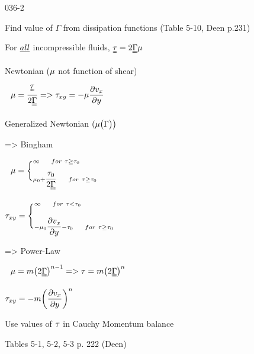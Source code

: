 \begin{mitframe}{036-2}
\begin{listone}
	\item Find value of $\Gamma$ from dissipation functions (Table 5-10, Deen p.231)
    \item For $\uline{all}$ incompressible fluids, $\uuline{\torque}=2\straintens\chempot$
    \item Newtonian ($\chempot$ not function of shear)
    	\begin{listtwo}
    		\item $~~\chempot=\dfrac{\uuline{\torque}}{2\straintens}=>\torque_{\disp{y}}=-\chempot\dfrac{\partial\vvel_{\disp}}{\partial{y}}$
		\end{listtwo}
\item Generalized Newtonian $(\chempot\big(\Gamma\big)\big)$
\item => Bingham
		\begin{listtwo}
        	\item $~~\chempot=\bigg\{^{\infty\tab for~ \torque\geq\torque_0}_{\chempot_0+\dfrac{\torque_0}{2\straintens}\tab for~ \torque\geq\torque_0}$
            \begin{listthree}
            		\item $\torque_{\disp{y}}=\Bigg\{^{\infty\tab for~ \torque<\torque_0}_{-\chempot_0\dfrac{\partial\vvel_{\disp}}{\partial{y}}-\torque_0 \tab for~\torque\geq\torque_0}$
                    
            \end{listthree}
        \end{listtwo}
\item => Power-Law
		\begin{listtwo}
        	\item $~~\chempot=\mass\big(2\straintens\big)^{n-1}=>\torque=\mass\big(2\straintens\big)^n$
            	\begin{listthree}
                	\item $\torque_{\disp{y}}=-\mass\bigg(\dfrac{\partial\vvel_{\disp}}{\partial{y}}\bigg)^n$
              \end{listthree}
          \end{listtwo}     
          
	\item Use values of $\torque$ in Cauchy Momentum balance
        	\begin{listtwo}
            	\item Tables 5-1, 5-2, 5-3 p. 222 (Deen)
            \end{listtwo}
       
\end{listone}    
\end{mitframe}